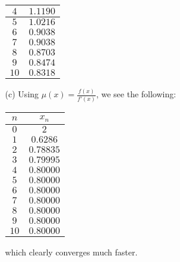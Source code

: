 \documentclass[12pt]{article}
\begin{document}
\begin{enumerate}[leftmargin=2em]
\begin{enumerate}
\begin{center}
\begin{tabular}{|c|c|}
			\hline
			$4$ & $1.1190$\\
			\hline
			$5$ & $1.0216$\\
			\hline
			$6$ & $0.9038$\\
			\hline
			$7$ & $0.9038$\\
			\hline
			$8$ & $0.8703$\\
			\hline
			$9$ & $0.8474$\\
			\hline
			$10$ & $0.8318$\\
			\hline
		    \end{tabular}
        	\end{center}
		  \item[(c)] Using $\mu(x)=\frac{f(x)}{f'(x)}$, we see the following:
			\begin{center}
			\begin{tabular}{|c|c|}
		  	\hline
			$n$ & $x_n$\\
			\hline
			$0$ & $2$\\
			\hline
			$1$ & $0.6286$\\
			\hline
			$2$ & $0.78835$\\
			\hline
			$3$ & $0.79995$\\
			\hline
			$4$ & $0.80000$\\
			\hline
			$5$ & $0.80000$\\
			\hline
			$6$ & $0.80000$\\
			\hline
			$7$ & $0.80000$\\
			\hline
			$8$ & $0.80000$\\
			\hline
			$9$ & $0.80000$\\
			\hline
			$10$ & $0.80000$\\
			\hline
			\end{tabular}
			\end{center}
			which clearly converges much faster.
    \end{enumerate}



\end{enumerate}
\end{document}
